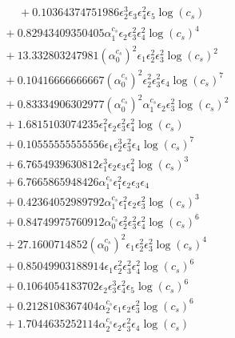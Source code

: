 \documentclass[10pt]{article}
\begin{document}
\begin{align*}
\phantom{F_{s,7}} &\phantom{={}}{}  + 0.10364374751986 \epsilon_{2}^{3} \epsilon_{3} \epsilon_{4}^{2} \epsilon_{5} \log{\left(c_{s} \right)} \\
&{}  + 0.82943409350405 \alpha_{1}^{c_s} \epsilon_{2} \epsilon_{3}^{2} \epsilon_{4}^{2} \log{\left(c_{s} \right)}^{4} \\
&{}  + 13.332803247981 \left(\alpha_{0}^{c_s}\right)^{2} \epsilon_{1} \epsilon_{2}^{2} \epsilon_{3}^{2} \log{\left(c_{s} \right)}^{2} \\
&{}  + 0.10416666666667 \left(\alpha_{0}^{c_s}\right)^{2} \epsilon_{2}^{2} \epsilon_{3}^{2} \epsilon_{4} \log{\left(c_{s} \right)}^{7} \\
&{}  + 0.83334906302977 \left(\alpha_{0}^{c_s}\right)^{2} \alpha_{1}^{c_s} \epsilon_{2} \epsilon_{3}^{2} \log{\left(c_{s} \right)}^{2} \\
&{}  + 1.6815103074235 \epsilon_{1}^{2} \epsilon_{2} \epsilon_{3}^{2} \epsilon_{4}^{2} \log{\left(c_{s} \right)} \\
&{}  + 0.10555555555556 \epsilon_{1} \epsilon_{2}^{3} \epsilon_{3}^{2} \epsilon_{4} \log{\left(c_{s} \right)}^{7} \\
&{}  + 6.7654939630812 \epsilon_{1}^{3} \epsilon_{2} \epsilon_{3} \epsilon_{4}^{2} \log{\left(c_{s} \right)}^{3} \\
&{}  + 6.7665865948426 \alpha_{1}^{c_s} \epsilon_{1}^{2} \epsilon_{2} \epsilon_{3} \epsilon_{4} \\
&{}  + 0.42364052989792 \alpha_{1}^{c_s} \epsilon_{1}^{2} \epsilon_{2} \epsilon_{3}^{2} \log{\left(c_{s} \right)}^{3} \\
&{}  + 0.84749975760912 \alpha_{0}^{c_s} \epsilon_{2}^{2} \epsilon_{3}^{2} \epsilon_{4}^{2} \log{\left(c_{s} \right)}^{6} \\
&{}  + 27.1600714852 \left(\alpha_{0}^{c_s}\right)^{2} \epsilon_{1} \epsilon_{2}^{2} \epsilon_{3}^{2} \log{\left(c_{s} \right)}^{4} \\
&{}  + 0.85049903188914 \epsilon_{1} \epsilon_{2}^{2} \epsilon_{3}^{2} \epsilon_{4}^{2} \log{\left(c_{s} \right)}^{6} \\
&{}  + 0.1064054183702 \epsilon_{2} \epsilon_{3}^{3} \epsilon_{4}^{2} \epsilon_{5} \log{\left(c_{s} \right)}^{6} \\
&{}  + 0.2128108367404 \alpha_{2}^{c_s} \epsilon_{1} \epsilon_{2} \epsilon_{3}^{2} \log{\left(c_{s} \right)}^{6} \\
&{}  + 1.7044635252114 \alpha_{2}^{c_s} \epsilon_{2} \epsilon_{3}^{2} \epsilon_{4} \log{\left(c_{s} \right)} \\

\end{align*}
\end{document}
